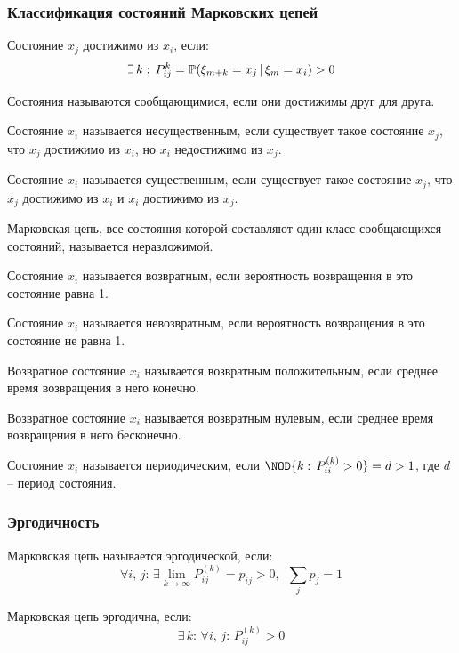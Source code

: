 \documentclass[12pt]{article}
\begin{document}
\subsubsection{Классификация состояний Марковских цепей}
\begin{definition}
    Состояние $x_j$ достижимо из $x_i$, если:
    $$\exists\,k:\,P^k_{ij}=\mathbb{P}(\xi_{m+k}=x_j\,|\,\xi_m=x_i)>0$$
\end{definition}
\begin{definition}
    Состояния называются сообщающимися, если они достижимы друг для друга.
\end{definition}
\begin{definition}
    Состояние $x_i$ называется несущественным, если существует такое состояние $x_j$, что $x_j$ достижимо из $x_i$, но $x_i$ недостижимо из $x_j$.
\end{definition}
\begin{definition}
    Состояние $x_i$ называется существенным, если существует такое состояние $x_j$, что $x_j$ достижимо из $x_i$ и $x_i$ достижимо из $x_j$.
\end{definition}
\begin{definition}
    Марковская цепь, все состояния которой составляют один класс сообщающихся состояний, называется неразложимой.
\end{definition}
\begin{definition}
    Состояние $x_i$ называется возвратным, если вероятность возвращения в это состояние равна 1.
\end{definition}
\begin{definition}
    Состояние $x_i$ называется невозвратным, если вероятность возвращения в это состояние не равна 1.
\end{definition}
\begin{definition}
    Возвратное состояние $x_i$ называется возвратным положительным, если среднее время возвращения в него конечно.
\end{definition}
\begin{definition}
    Возвратное состояние $x_i$ называется возвратным нулевым, если среднее время возвращения в него бесконечно.
\end{definition}
\begin{definition}
    Состояние $x_i$ называется периодическим, если $\NOD\{k:\,P^{(k)}_{ii}>0\}=d>1$, где $d$ -- период состояния.
\end{definition}
\subsubsection{Эргодичность}
\begin{definition}
    Марковская цепь называется эргодической, если:
    $$\forall i,\,j:\,\exists\lim_{k\to\infty}P^{(k)}_{ij}=p_{ij}>0,\enspace\sum_{j}p_j=1$$
\end{definition}
\begin{theorem}
    Марковская цепь эргодична, если:
    $$\exists\,k:\,\forall i,\,j:\,P^{(k)}_{ij}>0$$
\end{theorem}
\end{document}
